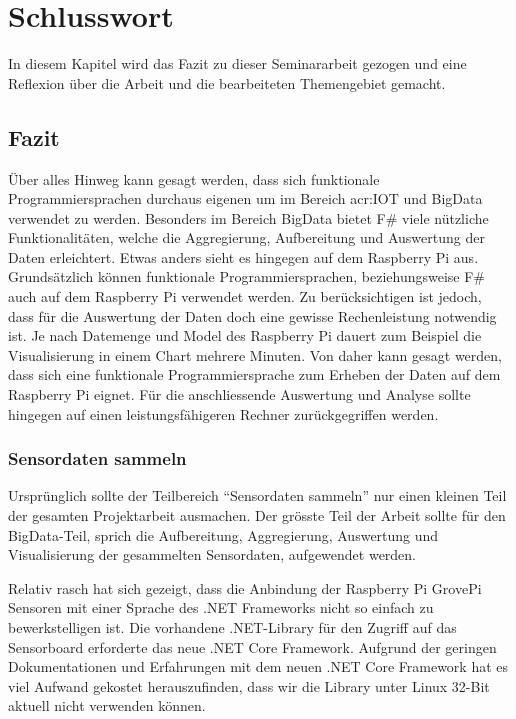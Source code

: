 
\chapter{Schlusswort} \label{chap:Finish}
In diesem Kapitel wird das Fazit zu dieser Seminararbeit gezogen und eine Reflexion über die Arbeit und die bearbeiteten Themengebiet gemacht.

\section{Fazit}
Über alles Hinweg kann gesagt werden, dass sich funktionale Programmiersprachen durchaus eigenen um im Bereich \gls{acr:IOT} und BigData verwendet zu werden. Besonders im Bereich BigData bietet F\# viele nützliche Funktionalitäten, welche die Aggregierung, Aufbereitung und Auswertung der Daten erleichtert. Etwas anders sieht es hingegen auf dem Raspberry Pi aus. Grundsätzlich können funktionale Programmiersprachen, beziehungsweise F\# auch auf dem Raspberry Pi verwendet werden. Zu berücksichtigen ist jedoch, dass für die Auswertung der Daten doch eine gewisse Rechenleistung notwendig ist. Je nach Datemenge und Model des Raspberry Pi dauert zum Beispiel die Visualisierung in einem Chart mehrere Minuten. Von daher kann gesagt werden, dass sich eine funktionale Programmiersprache zum Erheben der Daten auf dem Raspberry Pi eignet. Für die anschliessende Auswertung und Analyse sollte hingegen auf einen leistungsfähigeren Rechner zurückgegriffen werden.


\subsection{Sensordaten sammeln}
Ursprünglich sollte der Teilbereich "`Sensordaten sammeln"' nur einen kleinen Teil der gesamten Projektarbeit ausmachen. Der grösste Teil der Arbeit sollte für den BigData-Teil, sprich die Aufbereitung, Aggregierung, Auswertung und Visualisierung der gesammelten Sensordaten, aufgewendet werden. 

Relativ rasch hat sich gezeigt, dass die Anbindung der Raspberry Pi GrovePi Sensoren mit einer Sprache des .NET Frameworks nicht so einfach zu bewerkstelligen ist. Die vorhandene .NET-Library für den Zugriff auf das Sensorboard erforderte das neue .NET Core Framework. Aufgrund der geringen Dokumentationen und Erfahrungen mit dem neuen .NET Core Framework hat es viel Aufwand gekostet herauszufinden, dass wir die Library unter Linux 32-Bit aktuell nicht verwenden können.

